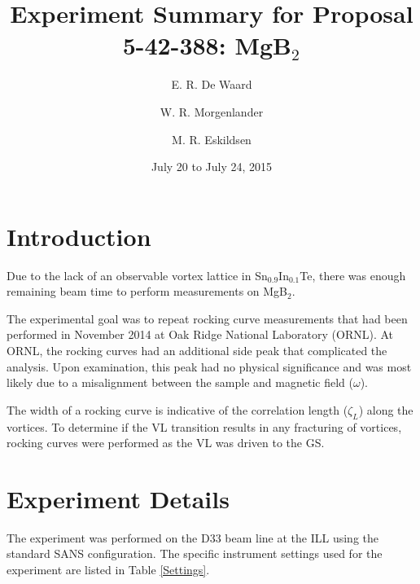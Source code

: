 \documentclass[aps, prl, reprint, groupedaddress, superscriptaddress, twocolumn]{revtex4-1}
\begin{document}
\title{Experiment Summary for Proposal 5-42-388:  MgB$_2$}
\author{E. R. De Waard}
\author{W. R. Morgenlander}
\author{M. R. Eskildsen}

\date{July 20 to July 24, 2015}


\newcommand{\dr}{dilution refrigerator}
\newcommand{\Lu}{LuNi$^{11}$B$_{2}$C }
\newcommand{\BSCCO}{Bi$_{2}$Sr$_{2}$CaCu$_{2}$O$_{y} $}
\newcommand{\Sr}{Sr$_{2}$RuO$_{4} $}
\newcommand{\Nb}{NbSe$_2$}
\newcommand{\Tc }{T$_c$}
\newcommand{\om }{$\Omega$}
\newcommand{\ax }{$a$-axis}
\newcommand{\cx }{$c$-axis}
\newcommand{\degree}{\ensuremath{^\circ}}
\newcommand{\SIT}{ Sn$_{0.9}$In$_{0.1}$Te }
\newcommand{\SITp}{Sn$_{0.9}$In$_{0.1}$Te}

\begin{abstract}
\end{abstract}

\maketitle


\section{Introduction}
Due to the lack of an observable vortex lattice in \SITp, there was enough remaining beam time to perform measurements on MgB$_2$.  


The experimental goal was to repeat rocking curve measurements that had been performed in November 2014 at Oak Ridge National Laboratory (ORNL).
At ORNL, the rocking curves had an additional side peak that complicated the analysis.  
Upon examination, this peak had no physical significance and was most likely due to a misalignment between the sample and magnetic field ($\omega$).

The width of a rocking curve is indicative of the correlation length ($\zeta_L$) along the vortices.  
To determine if the VL transition results in any fracturing of vortices, rocking curves were performed as the VL was driven to the GS.  



\section{Experiment Details}
The experiment was performed on the D33 beam line at the ILL using the standard SANS configuration.  The specific instrument settings used for the experiment are listed in Table \ref{Settings}.
\end{document}
